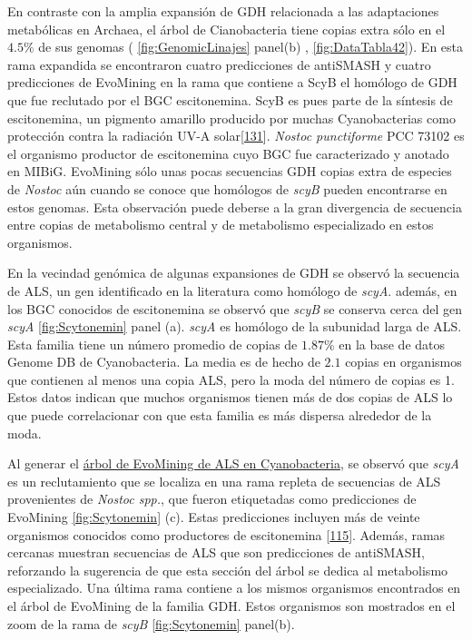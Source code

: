 \documentclass[12pt,twoside]{reedthesis}
\begin{document}
  En contraste con la amplia expansión de GDH relacionada a las
  adaptaciones metabólicas en Archaea, el árbol de Cianobacteria tiene
  copias extra sólo en el \(4.5\%\) de sus genomas (
  \autoref{fig:GenomicLinajes} panel(b) , \autoref{fig:DataTabla42}). En
  esta rama expandida se encontraron cuatro predicciones de antiSMASH y
  cuatro predicciones de EvoMining en la rama que contiene a ScyB el
  homólogo de GDH que fue reclutado por el BGC escitonemina. ScyB es pues
  parte de la síntesis de escitonemina, un pigmento amarillo producido por
  muchas Cyanobacterias como protección contra la radiación UV-A
  solar{[}\protect\hyperlink{ref-balskus_genetic_2010}{131}{]}.
  \emph{Nostoc punctiforme} PCC 73102 es el organismo productor de
  escitonemina cuyo BGC fue caracterizado y anotado en MIBiG. EvoMining
  sólo unas pocas secuencias GDH copias extra de especies de \emph{Nostoc}
  aún cuando se conoce que homólogos de \emph{scyB} pueden encontrarse en
  estos genomas. Esta observación puede deberse a la gran divergencia de
  secuencia entre copias de metabolismo central y de metabolismo
  especializado en estos organismos.
  
  En la vecindad genómica de algunas expansiones de GDH se observó la
  secuencia de ALS, un gen identificado en la literatura como homólogo de
  \emph{scyA}. además, en los BGC conocidos de escitonemina se observó que
  \emph{scyB} se conserva cerca del gen \emph{scyA}
  \autoref{fig:Scytonemin} panel (a). \emph{scyA} es homólogo de la
  subunidad larga de ALS. Esta familia tiene un número promedio de copias
  de \(1.87\%\) en la base de datos Genome DB de Cyanobacteria. La media
  es de hecho de \(2.1\) copias en organismos que contienen al menos una
  copia ALS, pero la moda del número de copias es 1. Estos datos indican
  que muchos organismos tienen más de dos copias de ALS lo que puede
  correlacionar con que esta familia es más dispersa alrededor de la moda.
  
  Al generar el
  \href{https://microreact.org/project/B11HkUtdm?tt=cr.}{árbol de
  EvoMining de ALS en Cyanobacteria}, se observó que \emph{scyA} es un
  reclutamiento que se localiza en una rama repleta de secuencias de ALS
  provenientes de \emph{Nostoc spp.}, que fueron etiquetadas como
  predicciones de EvoMining \autoref{fig:Scytonemin} (c). Estas
  predicciones incluyen más de veinte organismos conocidos como
  productores de escitonemina
  {[}\protect\hyperlink{ref-balskus_investigating_2008}{115}{]}. Además,
  ramas cercanas muestran secuencias de ALS que son predicciones de
  antiSMASH, reforzando la sugerencia de que esta sección del árbol se
  dedica al metabolismo especializado. Una última rama contiene a los
  mismos organismos encontrados en el árbol de EvoMining de la familia
  GDH. Estos organismos son mostrados en el zoom de la rama de \emph{scyB}
  \autoref{fig:Scytonemin} panel(b).
  
\end{document}
